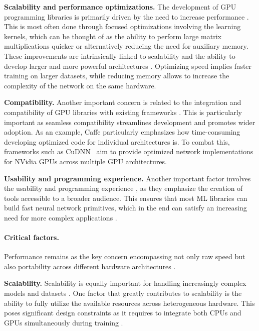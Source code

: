 \textbf{Scalability and performance optimizations.}
The development of GPU programming libraries is primarily driven by the need to increase
performance . This is most often done through focused %
optimizations involving the learning kernels, which can be thought of as the ability to perform
large matrix multiplications quicker or alternatively reducing the need for auxiliary memory. These
improvements are intrinsically linked to scalability and the ability to develop larger and more
powerful architectures . Optimizing speed implies faster training
on larger datasets, while reducing memory allows to increase the complexity of the network on
the same hardware.

\textbf{Compatibility.}
Another important concern is related to the integration and compatibility of GPU libraries with
existing frameworks . This is particularly important as seamless
compatibility streamlines development and promotes wider adoption. As an example, Caffe \cite{Jia.EtAl_2014a}
particularly emphasizes how time-consuming developing optimized code for individual architectures is.
To combat this, frameworks such as CuDNN~\cite{chetlur_cudnn_2014} aim to provide optimized network
implementations for NVidia GPUs across multiple GPU architectures.

\textbf{Usability and programming experience.}
Another important factor involves the usability and programming experience ,
as they emphasize the creation of tools accessible to a broader audience. This ensures that most
ML libraries can build fast neural network primitives, which in the end can satisfy an increasing
need for more complex applications .

\paragraph{Critical factors.}
Performance remains as the key concern encompassing not only raw speed but also portability across
different hardware architectures .

\textbf{Scalability.}
Scalability is equally important for handling increasingly complex models and datasets .
One factor that greatly contributes to scalability is the ability to fully utilize the available resources
across heterogeneous hardware. This poses significant design constraints as it requires to integrate
both CPUs and GPUs simultaneously during training .

